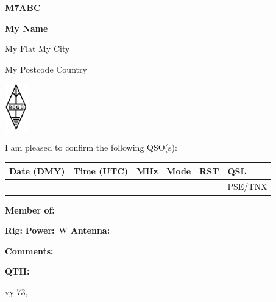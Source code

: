 \documentclass{article}
\renewcommand{\quad}{\hspace*{2.5ex}}
\begin{document}
\begin{minipage}{3.5cm}
{\Huge \textbf{M7ABC}} %

\smallskip

\textbf{My Name}

\smallskip

\footnotesize
My Flat
My City

My Postcode Country

\end{minipage}
\begin{minipage}{1.3cm}
\centering \includegraphics[width=1cm]{rsgb_logo_2016mono.png}
\end{minipage}
\hfill
\begin{minipage}{5.5cm} %

\smallskip

\end{minipage}

\bigskip

\small{I am pleased to confirm the following QSO(s):}
\begin{center}
\begin{tabular}{|P{2.5cm}|P{2cm}|P{1.3cm}|P{1.3cm}|P{1.3cm}|P{1.5cm}|}
\hline
\vphantom{$\dfrac a b$} \bf Date (DMY) & \bf Time (UTC) &\bf MHz &\bf Mode &\bf RST  & \bf QSL \\
\hline
\hline
\vphantom{$\dfrac b b$} & & & &  & PSE/TNX\\
\hline
\end{tabular}

\smallskip

\footnotesize\textbf{Member of:}
\end{center}

\bigskip

\textbf{Rig:} \makebox[2cm]{\hrulefill} \quad \textbf{Power:} \makebox[1cm]{\hrulefill}\,W \quad \textbf{Antenna:} \makebox[2cm]{\hrulefill}

\bigskip

\textbf{Comments:}

\bigskip

\textbf{QTH:}

\null\hfill vy 73, \makebox[3.5cm]{\dotfill}
\end{document}
